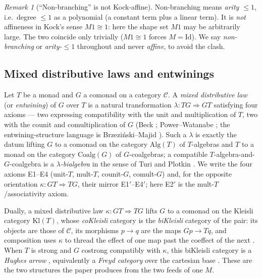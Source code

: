 \documentclass[11pt]{amsart}
\theoremstyle{plain}
\theoremstyle{definition}
\theoremstyle{remark}
\newtheorem{remark}[theorem]{Remark}
\newcommand{\Kl}{\mathrm{Kl}}
\newcommand{\Alg}{\mathrm{Alg}}
\newcommand{\Coalg}{\mathrm{Coalg}}
\begin{document}
\begin{remark}[``Non-branching'' is not Kock-affine]\label{rem:affine-clash}
Non-branching means \emph{arity $\le 1$}, i.e.\ degree $\le 1$ as a polynomial (a constant
term plus a linear term). It is \emph{not} affineness in Kock's sense $M1\cong 1$: here the
shape set $M1$ may be arbitrarily large. The two coincide only trivially ($M1\cong1$ forces
$M=\mathrm{Id}$). We say \emph{non-branching} or \emph{arity-$\le 1$} throughout and never
\emph{affine}, to avoid the clash.
\end{remark}

\subsection{Mixed distributive laws and entwinings}\label{sec:prelim-entwine}
Let $T$ be a monad and $G$ a comonad on a category $\mathcal C$. A \emph{mixed distributive
law} (or \emph{entwining}) of $G$ over $T$ is a natural transformation
$\lambda\colon TG\Rightarrow GT$ satisfying four axioms --- two expressing compatibility with
the unit and multiplication of $T$, two with the counit and comultiplication of $G$
(Beck \cite{Beck69}; Power--Watanabe \cite{PowerWatanabe02}; the entwining-structure
language is Brzezi\'nski--Majid \cite{BrzezinskiMajid98}). Such a $\lambda$ is exactly the
datum lifting $G$ to a comonad on the category $\Alg(T)$ of $T$-algebras and $T$ to a monad
on the category $\Coalg(G)$ of $G$-coalgebras; a compatible $T$-algebra-and-$G$-coalgebra is
a \emph{$\lambda$-bialgebra} in the sense of Turi and Plotkin \cite{TuriPlotkin97}. We write
the four axioms E1--E4 (unit-$T$, mult-$T$, counit-$G$, comult-$G$) and, for the opposite
orientation $\kappa\colon GT\Rightarrow TG$, their mirror E1$'$--E4$'$; here E2$'$ is the
mult-$T$/associativity axiom.

Dually, a mixed distributive law $\kappa\colon GT\Rightarrow TG$ lifts $G$ to a comonad on
the Kleisli category $\Kl(T)$, whose \emph{coKleisli} category is the \emph{biKleisli}
category of the pair: its objects are those of $\mathcal C$, its morphisms $p\to q$ are the
maps $Gp\to Tq$, and composition uses $\kappa$ to thread the effect of one map past the
coeffect of the next \cite{PowerWatanabe02,UustaluVene08}. When $T$ is strong and $G$
costrong compatibly with $\kappa$, this biKleisli category is a \emph{Hughes arrow}
\cite{Hughes00}, equivalently a \emph{Freyd category} over the cartesian base
\cite{PowerRobinson97,Atkey11,JacobsHeunenHasuo09}. These are the two structures the paper
produces from the two feeds of one $M$.
\end{document}
